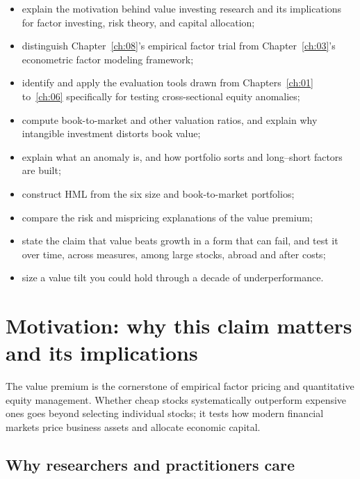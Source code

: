 \begin{itemize}
  \item explain the motivation behind value investing research and its implications for factor investing, risk theory, and capital allocation;
  \item distinguish Chapter~\ref{ch:08}'s empirical factor trial from Chapter~\ref{ch:03}'s econometric factor modeling framework;
  \item identify and apply the evaluation tools drawn from Chapters~\ref{ch:01} to~\ref{ch:06} specifically for testing cross-sectional equity anomalies;
  \item compute book-to-market and other valuation ratios, and explain why intangible investment distorts book value;
  \item explain what an anomaly is, and how portfolio sorts and long--short factors are built;
  \item construct HML from the six size and book-to-market portfolios;
  \item compare the risk and mispricing explanations of the value premium;
  \item state the claim that value beats growth in a form that can fail, and test it over time, across measures, among large stocks, abroad and after costs;
  \item size a value tilt you could hold through a decade of underperformance.
\end{itemize}

\section{Motivation: why this claim matters and its implications}
\label{sec:08-motivation}

The value premium is the cornerstone of empirical factor pricing and quantitative equity management. Whether cheap stocks systematically outperform expensive ones goes beyond selecting individual stocks; it tests how modern financial markets price business assets and allocate economic capital.

\subsection{Why researchers and practitioners care}

